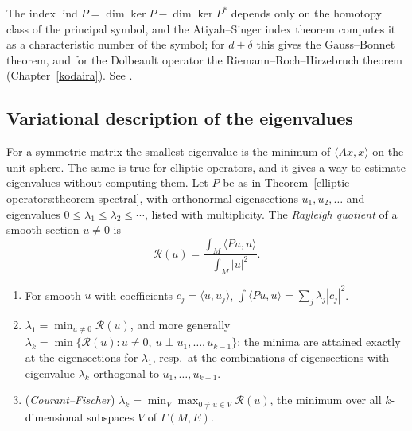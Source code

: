 \begin{remark}\label{elliptic-operators:remark-index}
The index $\operatorname{ind}P = \dim\ker P - \dim\ker P^*$ depends only on the homotopy class of the principal symbol, and the Atiyah--Singer index theorem computes it as a characteristic number of the
symbol; for $d + \delta$ this gives the Gauss--Bonnet theorem, and for the Dolbeault operator the Riemann--Roch--Hirzebruch theorem (Chapter~\ref{kodaira}). See \cite{lawson-michelsohn}.
\end{remark}

\subsection{Variational description of the eigenvalues}\label{elliptic-operators:subsection-min-max}

For a symmetric matrix the smallest eigenvalue is the minimum of $\langle Ax, x\rangle$ on the unit sphere. The same is true for elliptic operators, and it gives a way to estimate eigenvalues without
computing them. Let $P$ be as in Theorem~\ref{elliptic-operators:theorem-spectral}, with orthonormal eigensections $u_1, u_2, \ldots$ and eigenvalues $0 \leq \lambda_1 \leq \lambda_2 \leq \cdots$, listed with multiplicity.
The \emph{Rayleigh quotient} of a smooth section $u \neq 0$ is
\[
\mathcal{R}(u) = \frac{\int_M\langle Pu, u\rangle}{\int_M|u|^2}.
\]

\begin{proposition}\label{elliptic-operators:proposition-min-max}
\begin{enumerate}
\item For smooth $u$ with coefficients $c_j = \langle u, u_j\rangle$, $\int\langle Pu, u\rangle = \sum_j\lambda_j|c_j|^2$.
\item $\lambda_1 = \min_{u \neq 0}\mathcal{R}(u)$, and more generally $\lambda_k = \min\{\mathcal{R}(u) : u \neq 0, \ u \perp u_1, \ldots, u_{k-1}\}$; the minima are attained exactly at the eigensections for $\lambda_1$, resp.\ at
the combinations of eigensections with eigenvalue $\lambda_k$ orthogonal to $u_1, \ldots, u_{k-1}$.
\item (\emph{Courant--Fischer}) $\lambda_k = \min_V\max_{0 \neq u \in V}\mathcal{R}(u)$, the minimum over all $k$-dimensional subspaces $V$ of $\Gamma(M, E)$.
\end{enumerate}
\end{proposition}

